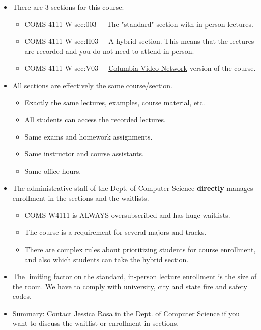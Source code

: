 \documentclass[11pt]{article}
\providecommand{\tightlist}{%
      \setlength{\itemsep}{0pt}\setlength{\parskip}{0pt}}
\begin{document}
\begin{itemize}
\item
  There are 3 sections for this course:

  \begin{itemize}
  \tightlist
  \item
    COMS 4111 W sec:003 \(-\) The "standard" section with in-person
    lectures.
  \item
    COMS 4111 W sec:H03 \(-\) A hybrid section. This means that the
    lectures are recorded and you do not need to attend in-person.
  \item
    COMS 4111 W sec:V03 \(-\) \href{https://cvn.columbia.edu/}{Columbia
    Video Network} version of the course.
  \end{itemize}
\item
  All sections are effectively the same course/section.

  \begin{itemize}
  \tightlist
  \item
    Exactly the same lectures, examples, course material, etc.
  \item
    All students can access the recorded lectures.
  \item
    Same exams and homework assignments.
  \item
    Same instructor and course assistants.
  \item
    Same office hours.
  \end{itemize}
\item
  The administrative staff of the Dept. of Computer Science
  \textbf{directly} manages enrollment in the sections and the
  waitlists.

  \begin{itemize}
  \tightlist
  \item
    COMS W4111 is ALWAYS oversubscribed and has huge waitlists.
  \item
    The course is a requirement for several majors and tracks.
  \item
    There are complex rules about prioritizing students for course
    enrollment, and also which students can take the hybrid section.
  \end{itemize}
\item
  The limiting factor on the standard, in-person lecture enrollment is
  the size of the room. We have to comply with university, city and
  state fire and safety codes.
\item
  Summary: Contact Jessica Rosa in the Dept. of Computer Science if you
  want to discuss the waitlist or enrollment in sections.
\end{itemize}
\end{document}
